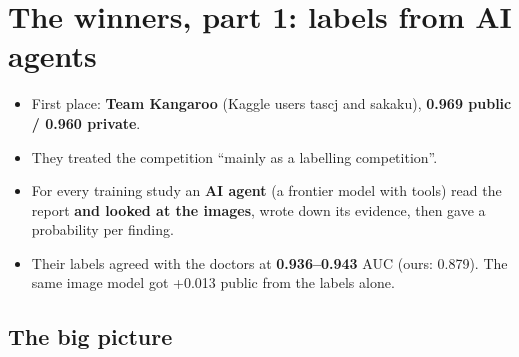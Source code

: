 \chapter[The winners, part 1: labels]{The winners, part 1: labels from AI agents}
\label{ch:winlabels}

\begin{tldr}
\begin{itemize}
\item First place: \textbf{Team Kangaroo} (Kaggle users tascj and sakaku), \textbf{0.969 public / 0.960 private}.
\item They treated the competition ``mainly as a labelling competition''.
\item For every training study an \textbf{AI agent} (a frontier model with tools) read the report \textbf{and looked at
      the images}, wrote down its evidence, then gave a probability per finding.
\item Their labels agreed with the doctors at \textbf{0.936--0.943} AUC (ours: 0.879). The same image model got
      +0.013 public from the labels alone.
\end{itemize}
\end{tldr}

\section{The big picture}

